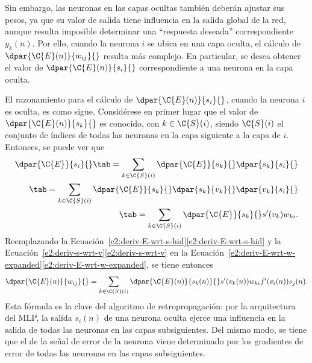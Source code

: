 Sin embargo, las neuronas en las capas ocultas también deberán ajustar
sus pesos, ya que su valor de salida tiene influencia en la salida
global de la red, aunque resulta imposible determinar una ``respuesta
deseada'' correspondiente $y_k(n)$.  Por ello, cuando la neurona $i$
se ubica en una capa oculta, el cálculo de $\dpar{\C{E}(n)}{w_{ij}}{}$
resulta más complejo.  En particular, se desea obtener el valor de
$\dpar{\C{E}(n)}{s_i}{}$ correspondiente a una neurona en la capa
oculta.

El razonamiento para el cálculo de $\dpar{\C{E}(n)}{s_{i}}{}$, cuando
la neurona $i$ es oculta, es como sigue. Considérese en primer lugar
que el valor de $\dpar{\C{E}(n)}{s_k}{}$ es conocido, con
$k\in{}\C{S}(i)$, siendo $\C{S}(i)$ el conjunto de índices de todas
las neuronas en la capa siguiente a la capa de $i$.  Entonces, se
puede ver que
%
\begin{align}\label{e2:deriv-E-wrt-s-hid} %
  \dpar{\C{E}}{s_i}{} \tab= \sum_{k\in\C{S}(i)}
      \dpar{\C{E}}{s_k}{}\dpar{s_k}{s_i}{} \notag\\
    \tab= \sum_{k\in\C{S}(i)}
      \dpar{\C{E}}{s_k}{}\dpar{s_k}{v_k}{}\dpar{v_k}{s_i}{} \notag\\
    \tab= \sum_{k\in\C{S}(i)} \dpar{\C{E}}{s_k}{} s'(v_k) w_{ki}.
\end{align}
%
Reemplazando la
\iflatexml{}Ecuación~\ref{e2:deriv-E-wrt-s-hid}\else\autoref{e2:deriv-E-wrt-s-hid}\fi
y la
\iflatexml{}Ecuación~\ref{e2:deriv-s-wrt-v}\else\autoref{e2:deriv-s-wrt-v}\fi
en la 
\iflatexml{}Ecuación~\ref{e2:deriv-E-wrt-w-expanded}\else\autoref{e2:deriv-E-wrt-w-expanded}\fi,
se tiene entonces
%
\begin{align}\label{e2:deriv-E-wrt-w-hid} %
  \dpar{\C{E}(n)}{w_{ij}}{} =
  \sum_{k\in\C{S}(i)} \dpar{\C{E}(n)}{s_k(n)}{} s'(v_k(n)) w_{ki}
  f'(v_i(n)) s_j(n).
\end{align}
%
Esta fórmula es la clave del algoritmo de retropropagación: por la
arquitectura del MLP, la salida $s_i(n)$ de una neurona oculta ejerce
una influencia en la salida de todas las neuronas en las capas
subsiguientes.  Del mismo modo, se tiene que el  de
la señal de error de la neurona viene determinado por los gradientes
de error de todas las neuronas en las capas subsiguientes.

